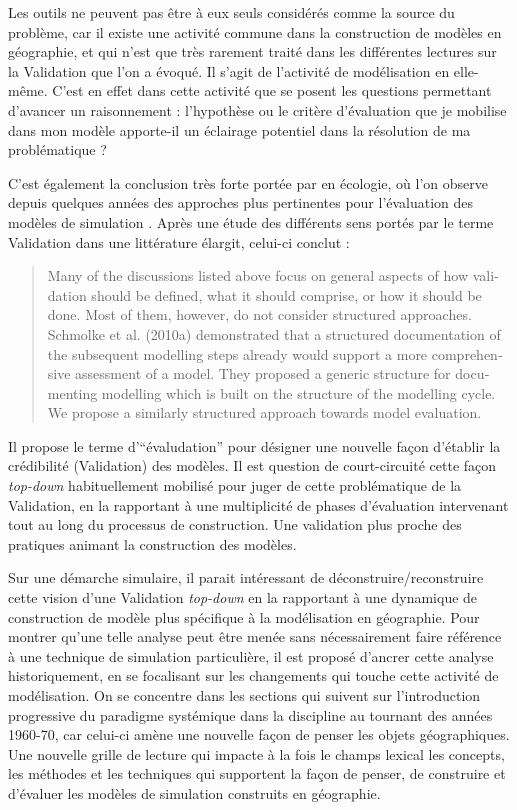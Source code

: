 Les outils ne peuvent pas être à eux seuls considérés comme la source du problème, car il existe une activité commune dans la construction de modèles en géographie, et qui n'est que très rarement traité dans les différentes lectures sur la Validation que l'on a évoqué. Il s'agit de l'activité de modélisation en elle-même. C'est en effet dans cette activité que se posent les questions permettant d'avancer un raisonnement : l'hypothèse ou le critère d'évaluation que je mobilise dans mon modèle apporte-il un éclairage potentiel dans la résolution de ma problématique ?


C'est également la conclusion très forte portée par \textcite{Augusiak2014} en écologie, où l'on observe depuis quelques années des approches plus pertinentes pour l'évaluation des modèles de simulation \autocites{Grimm2005,Grimm2010}. Après une étude des différents sens portés par le terme Validation dans une littérature élargit, celui-ci conclut : \foreignblockquote{english}[{\cite[120]{Augusiak2014}}]{Many of the discussions listed above focus on general aspects of how validation should be defined, what it should comprise, or how it should be done. Most of them, however, do not consider structured approaches. Schmolke et al. (2010a) demonstrated that a structured documentation of the subsequent modelling steps already would support a more comprehensive assessment of a model. They proposed a generic structure for documenting modelling which is built on the structure of the modelling cycle. We propose a similarly structured approach towards model evaluation.} 

Il propose le terme d'\enquote{évaludation} pour désigner une nouvelle façon d'établir la crédibilité (Validation) des modèles. Il est question de court-circuité cette façon \textit{top-down} habituellement mobilisé pour juger de cette problématique de la Validation, en la rapportant à une multiplicité de phases d'évaluation intervenant tout au long du processus de construction. Une validation plus proche des pratiques animant la construction des modèles.

Sur une démarche simulaire, il parait intéressant de déconstruire/reconstruire cette vision d'une Validation \textit{top-down} en la rapportant à une dynamique de construction de modèle plus spécifique à la modélisation en géographie. Pour montrer qu'une telle analyse peut être menée sans nécessairement faire référence à une technique de simulation particulière, il est proposé d'ancrer cette analyse historiquement, en se focalisant sur les changements qui touche cette activité de modélisation. On se concentre dans les sections qui suivent sur l'introduction progressive du paradigme systémique dans la discipline au tournant des années 1960-70, car celui-ci amène une nouvelle façon de penser les objets géographiques. Une nouvelle grille de lecture qui impacte à la fois le champs lexical les concepts, les méthodes et les techniques qui supportent la façon de penser, de construire et d'évaluer les modèles de simulation construits en géographie.
